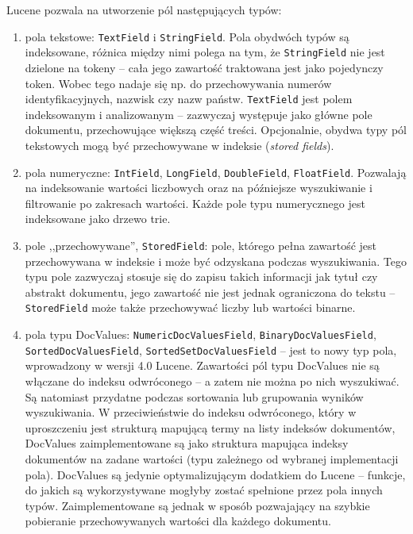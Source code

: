 Lucene pozwala na utworzenie pól następujących typów:
\begin{enumerate}
 \item pola tekstowe: \texttt{TextField} i \texttt{StringField}. Pola obydwóch typów są indeksowane, różnica między nimi polega na tym, że \texttt{StringField} nie jest dzielone na tokeny -- cała jego zawartość traktowana jest jako pojedynczy token. Wobec tego nadaje się np. do przechowywania numerów identyfikacyjnych, nazwisk czy nazw państw. \texttt{TextField} jest polem indeksowanym i analizowanym -- zazwyczaj występuje jako główne pole dokumentu, przechowujące większą część treści. Opcjonalnie, obydwa typy pól tekstowych mogą być przechowywane w indeksie (\emph{stored fields}).
 \item pola numeryczne: \texttt{IntField}, \texttt{LongField}, \texttt{DoubleField}, \texttt{FloatField}. Pozwalają na indeksowanie wartości liczbowych oraz na późniejsze wyszukiwanie i filtrowanie po zakresach wartości. Każde pole typu numerycznego jest indeksowane jako drzewo trie.
 \item pole ,,przechowywane'', \texttt{StoredField}: pole, którego pełna zawartość jest przechowywana w indeksie i może być odzyskana podczas wyszukiwania. Tego typu pole zazwyczaj stosuje się do zapisu takich informacji jak tytuł czy abstrakt dokumentu, jego zawartość nie jest jednak ograniczona do tekstu -- \texttt{StoredField} może także przechowywać liczby lub wartości binarne.
 \item pola typu DocValues: \texttt{NumericDocValuesField}, \texttt{BinaryDocValuesField}, \texttt{SortedDocValuesField}, \texttt{SortedSetDocValuesField} -- jest to nowy typ pola, wprowadzony w wersji 4.0 Lucene. Zawartości pól typu DocValues nie są włączane do indeksu odwróconego -- a zatem nie można po nich wyszukiwać. Są natomiast przydatne podczas sortowania lub grupowania wyników wyszukiwania. W przeciwieństwie do indeksu odwróconego, który w uproszczeniu jest strukturą mapującą termy na listy indeksów dokumentów, DocValues zaimplementowane są jako struktura mapująca indeksy dokumentów na zadane wartości (typu zależnego od wybranej implementacji pola). DocValues są jedynie optymalizującym dodatkiem do Lucene -- funkcje, do jakich są wykorzystywane mogłyby zostać spełnione przez pola innych typów. Zaimplementowane są jednak w sposób pozwajający na szybkie pobieranie przechowywanych wartości dla każdego dokumentu.
\end{enumerate}

